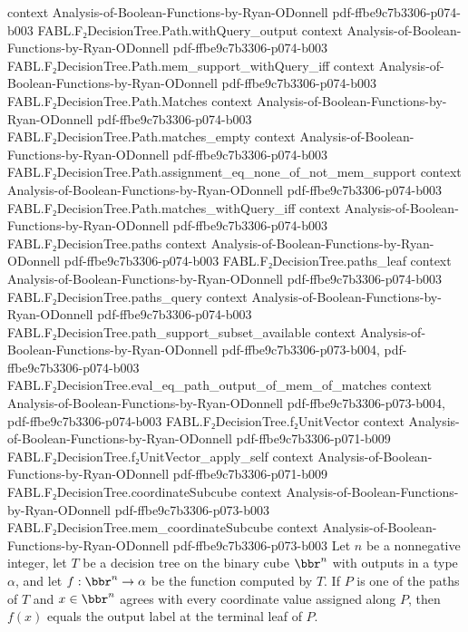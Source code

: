 \begin{theorem}
  {context}
  {Analysis-of-Boolean-Functions-by-Ryan-ODonnell}
  {pdf-ffbe9c7b3306-p074-b003}
\proofstep
  {FABL.F₂DecisionTree.Path.withQuery_output}
  {context}
  {Analysis-of-Boolean-Functions-by-Ryan-ODonnell}
  {pdf-ffbe9c7b3306-p074-b003}
\proofstep
  {FABL.F₂DecisionTree.Path.mem_support_withQuery_iff}
  {context}
  {Analysis-of-Boolean-Functions-by-Ryan-ODonnell}
  {pdf-ffbe9c7b3306-p074-b003}
\proofstep
  {FABL.F₂DecisionTree.Path.Matches}
  {context}
  {Analysis-of-Boolean-Functions-by-Ryan-ODonnell}
  {pdf-ffbe9c7b3306-p074-b003}
\proofstep
  {FABL.F₂DecisionTree.Path.matches_empty}
  {context}
  {Analysis-of-Boolean-Functions-by-Ryan-ODonnell}
  {pdf-ffbe9c7b3306-p074-b003}
\proofstep
  {FABL.F₂DecisionTree.Path.assignment_eq_none_of_not_mem_support}
  {context}
  {Analysis-of-Boolean-Functions-by-Ryan-ODonnell}
  {pdf-ffbe9c7b3306-p074-b003}
\proofstep
  {FABL.F₂DecisionTree.Path.matches_withQuery_iff}
  {context}
  {Analysis-of-Boolean-Functions-by-Ryan-ODonnell}
  {pdf-ffbe9c7b3306-p074-b003}
\proofstep
  {FABL.F₂DecisionTree.paths}
  {context}
  {Analysis-of-Boolean-Functions-by-Ryan-ODonnell}
  {pdf-ffbe9c7b3306-p074-b003}
\proofstep
  {FABL.F₂DecisionTree.paths_leaf}
  {context}
  {Analysis-of-Boolean-Functions-by-Ryan-ODonnell}
  {pdf-ffbe9c7b3306-p074-b003}
\proofstep
  {FABL.F₂DecisionTree.paths_query}
  {context}
  {Analysis-of-Boolean-Functions-by-Ryan-ODonnell}
  {pdf-ffbe9c7b3306-p074-b003}
\proofstep
  {FABL.F₂DecisionTree.path_support_subset_available}
  {context}
  {Analysis-of-Boolean-Functions-by-Ryan-ODonnell}
  {pdf-ffbe9c7b3306-p073-b004,
    pdf-ffbe9c7b3306-p074-b003}
\proofstep
  {FABL.F₂DecisionTree.eval_eq_path_output_of_mem_of_matches}
  {context}
  {Analysis-of-Boolean-Functions-by-Ryan-ODonnell}
  {pdf-ffbe9c7b3306-p073-b004,
    pdf-ffbe9c7b3306-p074-b003}
\proofstep
  {FABL.F₂DecisionTree.f₂UnitVector}
  {context}
  {Analysis-of-Boolean-Functions-by-Ryan-ODonnell}
  {pdf-ffbe9c7b3306-p071-b009}
\proofstep
  {FABL.F₂DecisionTree.f₂UnitVector_apply_self}
  {context}
  {Analysis-of-Boolean-Functions-by-Ryan-ODonnell}
  {pdf-ffbe9c7b3306-p071-b009}
\proofstep
  {FABL.F₂DecisionTree.coordinateSubcube}
  {context}
  {Analysis-of-Boolean-Functions-by-Ryan-ODonnell}
  {pdf-ffbe9c7b3306-p073-b003}
\proofstep
  {FABL.F₂DecisionTree.mem_coordinateSubcube}
  {context}
  {Analysis-of-Boolean-Functions-by-Ryan-ODonnell}
  {pdf-ffbe9c7b3306-p073-b003}
Let $n$ be a nonnegative integer, let $T$ be a decision tree on the binary cube $\bbr^n$
with outputs in a type $\alpha$, and let $f:\bbr^n\to\alpha$ be the function computed by
$T$. If $P$ is one of the paths of $T$ and $x\in\bbr^n$ agrees with every coordinate
value assigned along $P$, then $f(x)$ equals the output label at the terminal leaf of
$P$.
\end{theorem}

